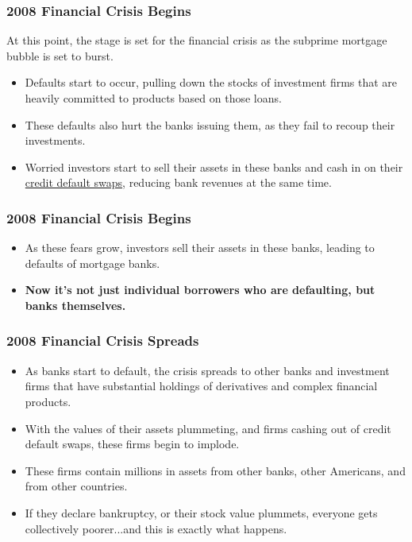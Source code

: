 \documentclass{beamer}
\begin{document}
\begin{frame} 
	\frametitle{\LARGE{2008 Financial Crisis Begins}}
	At this point, the stage is set for the financial crisis as the subprime mortgage bubble is set to burst.
	\begin{itemize}
		\item Defaults start to occur, pulling down the stocks of investment firms that are heavily committed to products based on those loans.
		\item These defaults also hurt the banks issuing them, as they fail to recoup their investments. \pause
		\item Worried investors start to sell their assets in these banks and cash in on their \href{https://www.investopedia.com/terms/c/creditdefaultswap.asp}{credit default swaps}, reducing bank revenues at the same time.  	
	\end{itemize}
\end{frame}

\begin{frame} 
	\frametitle{\LARGE{2008 Financial Crisis Begins}}
	\begin{itemize}
		\item As these fears grow, investors sell their assets in these banks, leading to defaults of mortgage banks. \pause
		\item \textbf{Now it's not just individual borrowers who are defaulting, but banks themselves.}		
	\end{itemize}
\end{frame}

\begin{frame} 
	\frametitle{\LARGE{2008 Financial Crisis Spreads}}
	\begin{itemize}
		\item As banks start to default, the crisis spreads to other banks and investment firms that have substantial holdings of derivatives and complex financial products. \pause
		\item With the values of their assets plummeting, and firms cashing out of credit default swaps, these firms begin to implode.		
		\item These firms contain millions in assets from other banks, other Americans, and from other countries. 
		\item If they declare bankruptcy, or their stock value plummets, everyone gets collectively poorer...and this is exactly what happens.		
	\end{itemize}
\end{frame}
\end{document}

